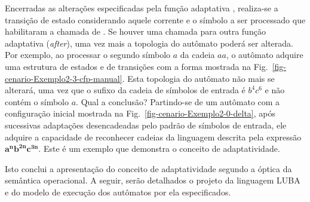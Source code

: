 
Encerradas as alterações especificadas pela função adaptativa , realiza-se a transição de estado considerando aquele corrente e o símbolo a ser processado que habilitaram a chamada de . Se houver uma chamada para outra função adaptativa (\textit{after}), uma vez mais a topologia do autômato poderá ser alterada. Por exemplo, ao processar o segundo símbolo $a$ da cadeia $aa$, o autômato adquire uma estrutura de estados e de transições com a forma mostrada na Fig.~\ref{fig-cenario-Exemplo2-3-cfp-manual}. Esta topologia do autômato não mais se alterará, uma vez que o sufixo da cadeia de símbolos de entrada é $b^4c^6$ e não contém o símbolo $a$. Qual a conclusão? Partindo-se de um autômato com a configuração inicial mostrada na Fig.~\ref{fig-cenario-Exemplo2-0-delta}, após sucessivas adaptações desencadeadas pelo padrão de símbolos de entrada, ele adquire a capacidade de reconhecer cadeias da linguagem descrita pela expressão $\mathbf{a^nb^{2n}c^{3n}}$. Este é um exemplo que demonstra o conceito de adaptatividade.


Isto conclui a apresentação do conceito de adaptatividade segundo a óptica da semântica operacional. A seguir, serão detalhados o projeto da linguagem LUBA e do modelo de execução dos autômatos por ela especificados.


